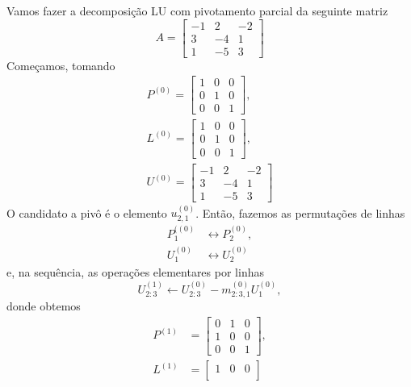 \begin{ex}\label{cap_sislin_sec_lu:ex:lup}
  Vamos fazer a decomposição LU com pivotamento parcial da seguinte matriz
  \begin{equation}
    A = \begin{bmatrix}
      -1 & 2 & -2\\
      3 & -4 & 1\\
      1 & -5 & 3
    \end{bmatrix}
  \end{equation}
  Começamos, tomando
  \begin{align}
    P^{(0)} =
    \begin{bmatrix}
      1 & 0 & 0\\
      0 & 1 & 0\\
      0 & 0 & 1
    \end{bmatrix},\\
    L^{(0)} =
    \begin{bmatrix}
      1 & 0 & 0\\
      0 & 1 & 0\\
      0 & 0 & 1      
    \end{bmatrix},\\
    U^{(0)} = 
    \begin{bmatrix}
      -1 & 2 & -2\\
      3 & -4 & 1\\
      1 & -5 & 3
    \end{bmatrix}
  \end{align}
  O candidato a pivô é o elemento $u^{(0)}_{2,1}$. Então, fazemos as permutações de linhas
  \begin{align}
    P_1^{((0)} &\leftrightarrow P_2^{(0)},\\
    U_1^{(0)} &\leftrightarrow U_2^{(0)}
  \end{align}
  e, na sequência, as operações elementares por linhas
  \begin{equation}
    U_{2:3}^{(1)}\leftarrow U_{2:3}^{(0)}-m^{(0)}_{2:3,1}U_1^{(0)},
  \end{equation}
  donde obtemos
  \begin{align}
    P^{(1)} &=
    \begin{bmatrix}
      0 & 1 & 0\\
      1 & 0 & 0\\
      0 & 0 & 1
    \end{bmatrix},\\
    L^{(1)} &=
    \begin{bmatrix}
      1 & 0 & 0\\

\end{bmatrix}
\end{align}
\end{ex}
